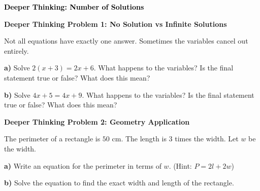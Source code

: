 \documentclass[12pt, letterpaper, fleqn]{article}
\begin{document}
\newpage

\begin{tcolorbox}[colback=customteal!20]
\large\textcolor{black}{\textbf{Deeper Thinking: Number of Solutions}}
\end{tcolorbox}

\vspace{3mm}

\begin{tcolorbox}[colback=white!15, colframe=black, boxrule=1.5pt, arc=4mm, left=6mm, right=6mm, top=5mm, bottom=5mm]

\textbf{Deeper Thinking Problem 1: No Solution vs Infinite Solutions}

\medskip

\noindent
Not all equations have exactly one answer. Sometimes the variables cancel out entirely.

\vspace{5mm}

\noindent
\textbf{a)} Solve $2(x + 3) = 2x + 6$. What happens to the variables? Is the final statement true or false? What does this mean?

\vspace{3cm}

\noindent
\textbf{b)} Solve $4x + 5 = 4x + 9$. What happens to the variables? Is the final statement true or false? What does this mean?

\vspace{3cm}

\end{tcolorbox}

\vspace{4mm}

\begin{tcolorbox}[colback=white!15, colframe=black, boxrule=1.5pt, arc=4mm, left=6mm, right=6mm, top=5mm, bottom=5mm]

\textbf{Deeper Thinking Problem 2: Geometry Application}

\medskip

\noindent
The perimeter of a rectangle is $50\text{ cm}$. The length is $3$ times the width. Let $w$ be the width.

\vspace{5mm}

\noindent
\textbf{a)} Write an equation for the perimeter in terms of $w$. (Hint: $P = 2l + 2w$)

\vspace{2.5cm}

\noindent
\textbf{b)} Solve the equation to find the exact width and length of the rectangle.

\vspace{3cm}

\end{tcolorbox}
\end{document}
